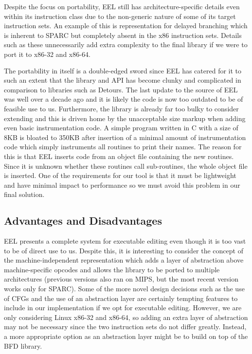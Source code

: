 Despite the focus on portability, EEL still has architecture-specific details even within its instruction class due to the non-generic nature of some of its target instruction sets. An example of this is representation for delayed branching which is inherent to SPARC but completely absent in the x86 instruction sets. Details such as these unnecessarily add extra complexity to the final library if we were to port it to x86-32 and x86-64.

The portability in itself is a double-edged sword since EEL has catered for it to such an extent that the library and API has become clunky and complicated in comparison to libraries such as Detours. The last update to the source of EEL was well over a decade ago and it is likely the code is now too outdated to be of feasible use to us. Furthermore, the library is already far too bulky to consider extending and this is driven home by the unacceptable size markup when adding even basic instrumentation code. A simple program written in C with a size of 8KB is bloated to 350KB after insertion of a minimal amount of instrumentation code which simply instruments all routines to print their names\cite{leel}. The reason for this is that EEL inserts code from an object file containing the new routines. Since it is unknown whether these routines call sub-routines, the whole object file is inserted. One of the requirements for our tool is that it must be lightweight and have minimal impact to performance so we must avoid this problem in our final solution.

\subsection{Advantages and Disadvantages}

EEL presents a complete system for executable editing even though it is too vast to be of direct use to us. Despite this, it is interesting to consider the concept of the machine-independent representation which adds a layer of abstraction above machine-specific opcodes and allows the library to be ported to multiple architectures (previous versions also ran on MIPS, but the most recent version works only for SPARC). Some of the more novel design decisions such as the use of CFGs and the use of an abstraction layer are certainly tempting features to include in our implementation if we opt for executable editing. However, we are only considering Linux x86-32 and x86-64, so adding an extra layer of abstraction may not be necessary since the two instruction sets do not differ greatly. Instead, a more appropriate option as an abstraction layer might be to build on top of the BFD library.

